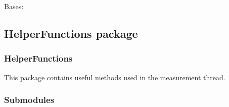 \documentclass[letterpaper,10pt,english]{sphinxmanual}
\begin{document}
\begin{fulllineitems}
\label{\detokenize{NoSeMazeControl/Designs:Designs.settingWindow.Ui_MainWindow}}
\pysigstartsignatures
{}
\pysigstopsignatures
\sphinxAtStartPar
Bases: 

\begin{fulllineitems}
\label{\detokenize{NoSeMazeControl/Designs:Designs.settingWindow.Ui_MainWindow.retranslateUi}}
\pysigstartsignatures
{}
\pysigstopsignatures
\end{fulllineitems}


\begin{fulllineitems}
\label{\detokenize{NoSeMazeControl/Designs:Designs.settingWindow.Ui_MainWindow.setupUi}}
\pysigstartsignatures
{}
\pysigstopsignatures
\end{fulllineitems}


\end{fulllineitems}


\sphinxstepscope


\subsection{HelperFunctions package}
\label{\detokenize{NoSeMazeControl/HelperFunctions:helperfunctions-package}}\label{\detokenize{NoSeMazeControl/HelperFunctions::doc}}

\subsubsection{HelperFunctions}
\label{\detokenize{NoSeMazeControl/HelperFunctions:helperfunctions}}
\sphinxAtStartPar
This package contains useful methods used in the measurement thread.


\subsubsection{Submodules}
\label{\detokenize{NoSeMazeControl/HelperFunctions:submodules}}
\end{document}
